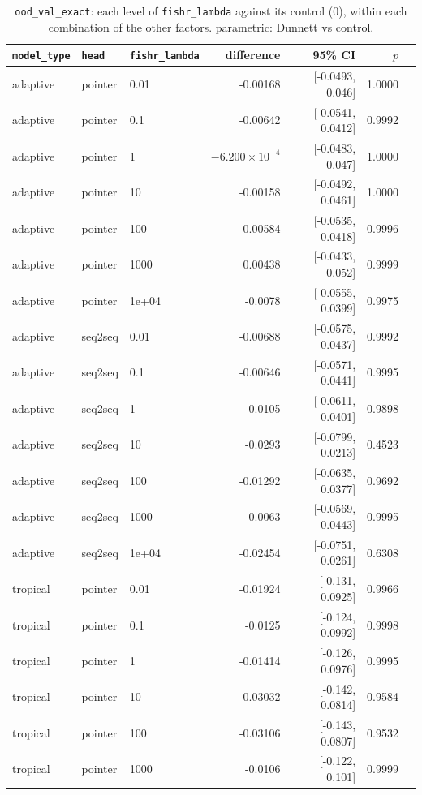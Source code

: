 \documentclass[10pt]{article}
\begin{document}
{\small
\begin{longtable}{lllrrrl}
\caption{\texttt{ood\_val\_exact}: each level of \texttt{fishr\_lambda} against its control (0), within each combination of the other factors. parametric: Dunnett vs control.}\label{tab:control-ood_val_exact}\\
\toprule
\texttt{model\_type} & \texttt{head} & \texttt{fishr\_lambda} & difference & 95\% CI & $p$ & \\
\midrule
\endhead
adaptive & pointer & 0.01 & -0.00168 & [-0.0493, 0.046] & 1.0000 & \\
adaptive & pointer & 0.1 & -0.00642 & [-0.0541, 0.0412] & 0.9992 & \\
adaptive & pointer & 1 & $-6.200\times10^{-4}$ & [-0.0483, 0.047] & 1.0000 & \\
adaptive & pointer & 10 & -0.00158 & [-0.0492, 0.0461] & 1.0000 & \\
adaptive & pointer & 100 & -0.00584 & [-0.0535, 0.0418] & 0.9996 & \\
adaptive & pointer & 1000 & 0.00438 & [-0.0433, 0.052] & 0.9999 & \\
adaptive & pointer & 1e+04 & -0.0078 & [-0.0555, 0.0399] & 0.9975 & \\
adaptive & seq2seq & 0.01 & -0.00688 & [-0.0575, 0.0437] & 0.9992 & \\
adaptive & seq2seq & 0.1 & -0.00646 & [-0.0571, 0.0441] & 0.9995 & \\
adaptive & seq2seq & 1 & -0.0105 & [-0.0611, 0.0401] & 0.9898 & \\
adaptive & seq2seq & 10 & -0.0293 & [-0.0799, 0.0213] & 0.4523 & \\
adaptive & seq2seq & 100 & -0.01292 & [-0.0635, 0.0377] & 0.9692 & \\
adaptive & seq2seq & 1000 & -0.0063 & [-0.0569, 0.0443] & 0.9995 & \\
adaptive & seq2seq & 1e+04 & -0.02454 & [-0.0751, 0.0261] & 0.6308 & \\
tropical & pointer & 0.01 & -0.01924 & [-0.131, 0.0925] & 0.9966 & \\
tropical & pointer & 0.1 & -0.0125 & [-0.124, 0.0992] & 0.9998 & \\
tropical & pointer & 1 & -0.01414 & [-0.126, 0.0976] & 0.9995 & \\
tropical & pointer & 10 & -0.03032 & [-0.142, 0.0814] & 0.9584 & \\
tropical & pointer & 100 & -0.03106 & [-0.143, 0.0807] & 0.9532 & \\
tropical & pointer & 1000 & -0.0106 & [-0.122, 0.101] & 0.9999 & \\

\end{longtable}}
\end{document}
